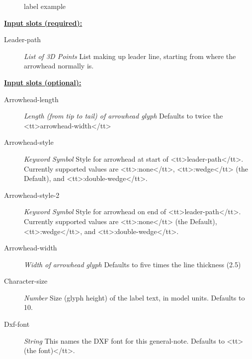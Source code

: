 \documentclass [11pt]{book}
\begin{document}
\begin{itemize}
\begin{figure}
\caption{label example}

\label{fig:label}

\end{figure}





\textbf{
\underline{Input slots (required):}}

\begin{description}

\item [Leader-path]
\emph{List of 3D Points} List making up leader line, starting from where the arrowhead normally is.


\end{description}






\textbf{
\underline{Input slots (optional):}}

\begin{description}

\item [Arrowhead-length]
\emph{Length (from tip to tail) of arrowhead glyph} Defaults to twice the <tt>arrowhead-width</tt>


\item [Arrowhead-style]
\emph{Keyword Symbol} Style for arrowhead at start of <tt>leader-path</tt>. Currently supported values
are <tt>:none</tt>, <tt>:wedge</tt>  (the Default), and <tt>:double-wedge</tt>.


\item [Arrowhead-style-2]
\emph{Keyword Symbol} Style for arrowhead on end of <tt>leader-path</tt>. Currently supported values
are <tt>:none</tt> (the Default), <tt>:wedge</tt>, and <tt>:double-wedge</tt>.


\item [Arrowhead-width]
\emph{Width of arrowhead glyph} Defaults to five times the line thickness (2.5)


\item [Character-size]
\emph{Number} Size (glyph height) of the label text, in model units. Defaults to 10.


\item [Dxf-font]
\emph{String} This names the DXF font for this general-note. Defaults to <tt>(the font)</tt>.



\end{description}
\end{itemize}
\end{document}
